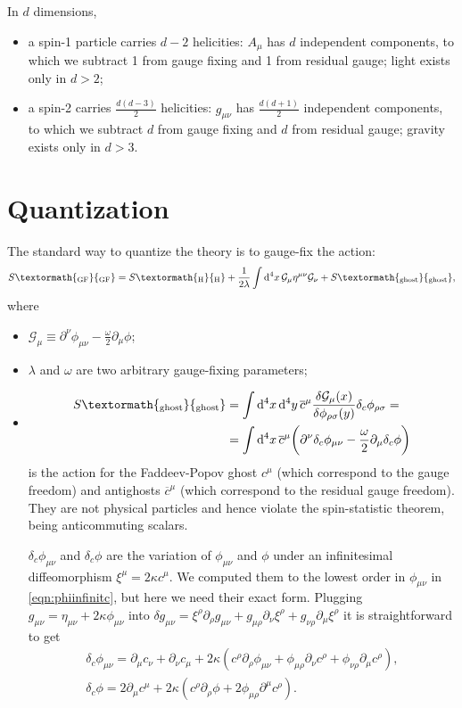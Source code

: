 \documentclass[a4paper,12pt]{book}
\newcommand{\ped}[1]{\textormath{\textsubscript{#1}}{_{\mathrm{#1}}}}
\newcommand{\dd}{\mathop{\mathrm{d}\!}{}}
\theoremstyle{definition}
\theoremstyle{remark}
\begin{document}
In $d$ dimensions,
\begin{itemize}
\item a spin-1 particle carries $d-2$ helicities: $A_\mu$ has $d$ independent components, to which we subtract 1 from gauge fixing and 1 from residual gauge; light exists only in $d>2$;
\item a spin-2 carries $\frac{d(d-3)}2$ helicities: $g_{\mu\nu}$ has $\frac{d(d+1)}2$ independent components, to which we subtract $d$ from gauge fixing and $d$ from residual gauge; gravity exists only in $d>3$.
\end{itemize}

\section{Quantization}
The standard way to quantize the theory is to gauge-fix the action:
\[S\ped{GF}=S\ped{H}+\frac1{2\lambda}\int\dd^4x\,\mathcal G_\mu\eta^{\mu\nu}\mathcal G_\nu+S\ped{ghost},\]
where
\begin{itemize}
\item $\mathcal G_\mu\equiv\partial^\nu\phi_{\mu\nu}-\frac\omega2\partial_\mu\phi$;
\item $\lambda$ and $\omega$ are two arbitrary gauge-fixing parameters;
\item \begin{align*}
S\ped{ghost}&=\int\dd^4x\dd^4y\,\overline c^\mu\frac{\delta\mathcal G_\mu(x)}{\delta\phi_{\rho\sigma}(y)}\delta_c\phi_{\rho\sigma}=\\
&=\int\dd^4x\,\overline c^\mu\biggl(\partial^\nu\delta_c\phi_{\mu\nu}-\frac\omega2\partial_\mu\delta_c\phi\biggr)%
\end{align*}is the action for the Faddeev-Popov ghost $c^\mu$ (which correspond to the gauge freedom) and antighosts $\overline c^\mu$ (which correspond to the residual gauge freedom). They are not physical particles and hence violate the spin-statistic theorem, being anticommuting scalars.

$\delta_c\phi_{\mu\nu}$ and $\delta_c\phi$ are the variation of $\phi_{\mu\nu}$ and $\phi$ under an infinitesimal diffeomorphism $\xi^\mu=2\kappa c^\mu$. We computed them to the lowest order in $\phi_{\mu\nu}$ in \cref{eqn:phiinfinitc}, but here we need their exact form. Plugging $g_{\mu\nu}=\eta_{\mu\nu}+2\kappa\phi_{\mu\nu}$ into $\delta g_{\mu\nu}=\xi^\rho\partial_\rho g_{\mu\nu}+g_{\mu\rho}\partial_\nu\xi^\rho+g_{\nu\rho}\partial_\mu\xi^\rho$ it is straightforward to get
\begin{gather*}
\delta_c\phi_{\mu\nu}=\partial_\mu c_\nu+\partial_\nu c_\mu+2\kappa(c^\rho\partial_\rho\phi_{\mu\nu}+\phi_{\mu\rho}\partial_\nu c^\rho+\phi_{\nu\rho}\partial_\mu c^\rho),\\
\delta_c\phi=2\partial_\mu c^\mu+2\kappa(c^\rho\partial_\rho \phi+2\phi_{\mu\rho}\partial^\mu c^\rho).
\end{gather*}
\end{itemize}
\end{document}
